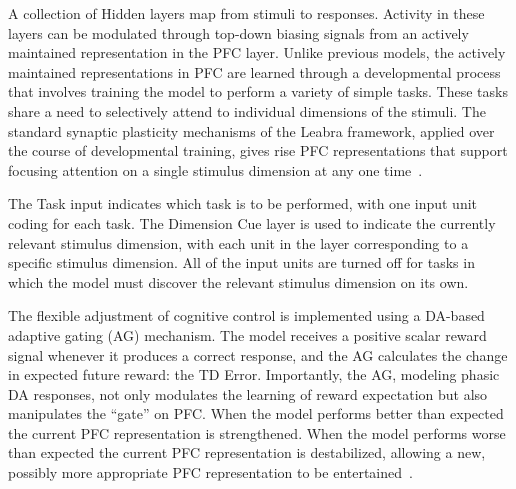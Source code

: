 A collection of Hidden layers map from stimuli to responses. Activity in these layers can be modulated through top-down biasing signals from an actively maintained representation in the PFC layer. Unlike previous models, the actively maintained representations in PFC are learned through a developmental process that involves training the model to perform a variety of simple tasks. These tasks share a need to selectively attend to individual dimensions of the stimuli. The standard synaptic plasticity mechanisms of the Leabra framework, applied over the course of developmental training, gives rise PFC representations that support focusing attention on a single stimulus dimension at any one time~\cite{RougierNP:2005:XT}.

The Task input indicates which task is to be performed, with one input unit coding for each task. The Dimension Cue layer is used to indicate the currently relevant stimulus dimension, with each unit in the layer corresponding to a specific stimulus dimension. All of the input units are turned off for tasks in which the model must discover the relevant stimulus dimension on its own.

The flexible adjustment of cognitive control is implemented using a DA-based adaptive gating (AG) mechanism. The model receives a positive scalar reward signal whenever it produces a correct response, and the AG calculates the change in expected future reward: the TD Error. Importantly, the AG, modeling phasic DA responses, not only modulates the learning of reward expectation but also manipulates the ``gate'' on PFC. When the model performs better than expected the current PFC representation is strengthened. When the model performs worse than expected the current PFC representation is destabilized, allowing a new, possibly more appropriate PFC representation to be entertained~\cite{RougierNP:2005:XT}.


